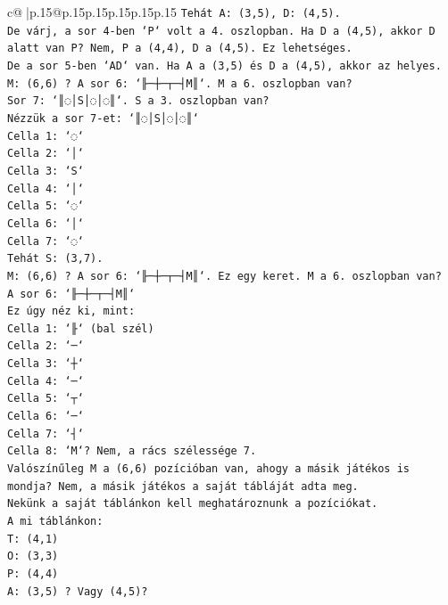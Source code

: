 \documentclass{article}
\begin{document}
{\begin{supertabular}{c@{$\;$}|p{.15\linewidth}@{}p{.15\linewidth}p{.15\linewidth}p{.15\linewidth}p{.15\linewidth}p{.15\linewidth}}
{{{\texttt{Tehát A: (3,5), D: (4,5).} \\
\texttt{De várj, a sor 4{-}ben `P` volt a 4. oszlopban. Ha D a (4,5), akkor D alatt van P? Nem, P a (4,4), D a (4,5). Ez lehetséges.} \\
\texttt{De a sor 5{-}ben `AD` van. Ha A a (3,5) és D a (4,5), akkor az helyes.} \\
\texttt{M: (6,6) ? A sor 6: `╟─┼─┬─┤M║`. M a 6. oszlopban van?} \\
\texttt{Sor 7: `║◌│S│◌│◌║`. S a 3. oszlopban van?} \\
\texttt{Nézzük a sor 7{-}et: `║◌│S│◌│◌║`} \\
\texttt{Cella 1: `◌`} \\
\texttt{Cella 2: `│`} \\
\texttt{Cella 3: `S`} \\
\texttt{Cella 4: `│`} \\
\texttt{Cella 5: `◌`} \\
\texttt{Cella 6: `│`} \\
\texttt{Cella 7: `◌`} \\
\texttt{Tehát S: (3,7).} \\
\texttt{M: (6,6) ? A sor 6: `╟─┼─┬─┤M║`. Ez egy keret. M a 6. oszlopban van?} \\
\texttt{A sor 6: `╟─┼─┬─┤M║`} \\
\texttt{Ez úgy néz ki, mint:} \\
\texttt{Cella 1: `╟` (bal szél)} \\
\texttt{Cella 2: `─`} \\
\texttt{Cella 3: `┼`} \\
\texttt{Cella 4: `─`} \\
\texttt{Cella 5: `┬`} \\
\texttt{Cella 6: `─`} \\
\texttt{Cella 7: `┤`} \\
\texttt{Cella 8: `M`? Nem, a rács szélessége 7.} \\
\texttt{Valószínűleg M a (6,6) pozícióban van, ahogy a másik játékos is mondja? Nem, a másik játékos a saját tábláját adta meg.} \\
\texttt{Nekünk a saját táblánkon kell meghatároznunk a pozíciókat.} \\
\texttt{A mi táblánkon:} \\
\texttt{T: (4,1)} \\
\texttt{O: (3,3)} \\
\texttt{P: (4,4)} \\
\texttt{A: (3,5) ? Vagy (4,5)?} \\
}}}
\end{supertabular}}
\end{document}
